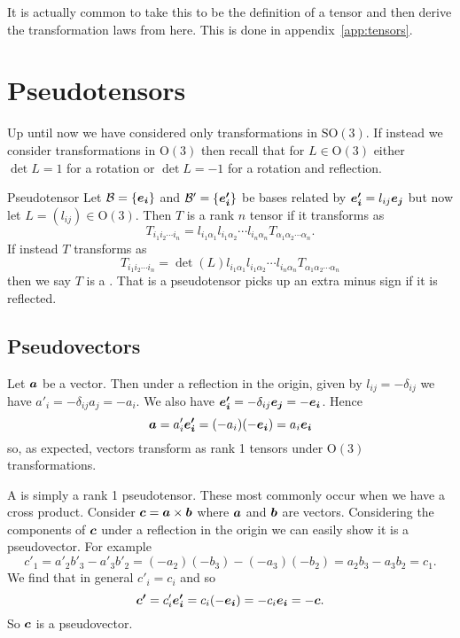 \documentclass[a4paper]{article}
\newcommand{\orthogonalGroup}{\mathrm{O}}
\newcommand{\specialOrthogonalGroup}{\mathrm{SO}}
\newcommand{\basis}{\mathcal{B}}
\newcommand{\veprime}[1]{\vv{e'_{#1}}}
\newcommand{\nindices}[2]{{ {#1}_1 {#1}_2 \dotsm {#1}_{#2} }}
\begin{document}
    It is actually common to take this to be the definition of a tensor and then derive the transformation laws from here.
    This is done in appendix~\ref{app:tensors}.
    
    \section{Pseudotensors}
    Up until now we have considered only transformations in \(\specialOrthogonalGroup(3)\).
    If instead we consider transformations in \(\orthogonalGroup(3)\) then recall that for \(L\in\orthogonalGroup(3)\) either \(\det L = 1\) for a rotation or \(\det L = -1\) for a rotation and reflection.
    
    \begin{definition}{Pseudotensor}{}
        Let \(\basis = \{\ve{i}\}\) and \(\basis' = \{\veprime{i}\}\) be bases related by \(\veprime{i} = l_{ij}\ve{j}\) but now let \(L = (l_{ij})\in\orthogonalGroup(3)\).
        Then \(T\) is a rank \(n\) tensor if it transforms as
        \[T_{\nindices{i}{n}} = l_{i_1\alpha_1}l_{i_1\alpha_2}\dotsm l_{i_n\alpha_n}T_{\nindices{\alpha}{n}}.\]
        If instead \(T\) transforms as
        \[T_{\nindices{i}{n}} = \det(L) l_{i_1\alpha_1}l_{i_1\alpha_2}\dotsm l_{i_n\alpha_n}T_{\nindices{\alpha}{n}}\]
        then we say \(T\) is a .
        That is a pseudotensor picks up an extra minus sign if it is reflected.
    \end{definition}
    
    \subsection{Pseudovectors}
    Let \(\bm{a}\) be a vector.
    Then under a reflection in the origin, given by \(l_{ij} = -\delta_{ij}\) we have \(a'_i = -\delta_{ij}a_j = -a_i\).
    We also have \(\bm{e'_i} = -\delta_{ij}\bm{e_{j}} = -\bm{e_{i}}\).
    Hence
    \[\bm{a} = a'_i\bm{e'_i} = (-a_i)(-\bm{e_{i}}) = a_i\bm{e_{i}}\]
    so, as expected, vectors transform as rank 1 tensors under \(\orthogonalGroup(3)\) transformations.
    
    A  is simply a rank 1 pseudotensor.
    These most commonly occur when we have a cross product.
    Consider \(\bm{c} = \bm{a}\times\bm{b}\) where \(\bm{a}\) and \(\bm{b}\) are vectors.
    Considering the components of \(\bm{c}\) under a reflection in the origin we can easily show it is a pseudovector.
    For example
    \[c'_1 = a'_2b'_3 - a'_3b'_2 = (-a_2)(-b_3) - (-a_3)(-b_2) = a_2b_3 - a_3b_2 = c_1.\]
    We find that in general \(c'_i = c_i\) and so
    \[\bm{c'} = c'_i\bm{e'_i} = c_i(-\bm{e_{i}}) = -c_i\bm{e_{i}} = -\bm{c}.\]
    So \(\bm{c}\) is a pseudovector.
    
\end{document}
